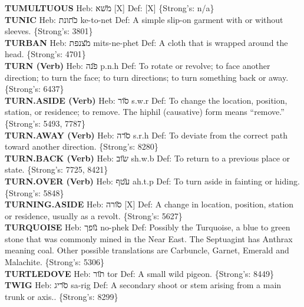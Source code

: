 {\textbf{TUMULTUOUS} Heb: {\large\H משא} {[}X{]} Def: {[}X{]} \{Strong's: n/a\}\hfill{}\\

\textbf{TUNIC} Heb: {\large\H כתונת} ke-to-net Def: A simple slip-on garment with or without sleeves. \{Strong's: 3801\}\hfill{}\\

\textbf{TURBAN} Heb: {\large\H מצנפת} mits-ne-phet Def: A cloth that is wrapped around the head. \{Strong's: 4701\}\hfill{}\\

\textbf{TURN (Verb)} Heb: {\large\H פנה} p.n.h Def: To rotate or revolve; to face another direction; to turn the face; to turn directions; to turn something back or away. \{Strong's: 6437\}\hfill{}\\

\textbf{TURN.ASIDE (Verb)} Heb: {\large\H סור} s.w.r Def: To change the location, position, station, or residence; to remove. The hiphil (causative) form means ``remove.'' \{Strong's: 5493, 7787\}\hfill{}\\

\textbf{TURN.AWAY (Verb)} Heb: {\large\H סרה} s.r.h Def: To deviate from the correct path toward another direction. \{Strong's: 8280\}\hfill{}\\

\textbf{TURN.BACK (Verb)} Heb: {\large\H שוב} sh.w.b Def: To return to a previous place or state. \{Strong's: 7725, 8421\}\hfill{}\\

\textbf{TURN.OVER (Verb)} Heb: {\large\H עטף} ah.t.p Def: To turn aside in fainting or hiding. \{Strong's: 5848\}\hfill{}\\

\textbf{TURNING.ASIDE} Heb: {\large\H סורה} {[}X{]} Def: A change in location, position, station or residence, usually as a revolt. \{Strong's: 5627\}\hfill{}\\

\textbf{TURQUOISE} Heb: {\large\H נופך} no-phek Def: Possibly the Turquoise, a blue to green stone that was commonly mined in the Near East. The Septuagint has Anthrax meaning coal. Other possible translations are Carbuncle, Garnet, Emerald and Malachite. \{Strong's: 5306\}\hfill{}\\

\textbf{TURTLEDOVE} Heb: {\large\H תור} tor Def: A small wild pigeon. \{Strong's: 8449\}\hfill{}\\

\textbf{TWIG} Heb: {\large\H סריג} sa-rig Def: A secondary shoot or stem arising from a main trunk or axis.. \{Strong's: 8299\}\hfill{}\\

}
